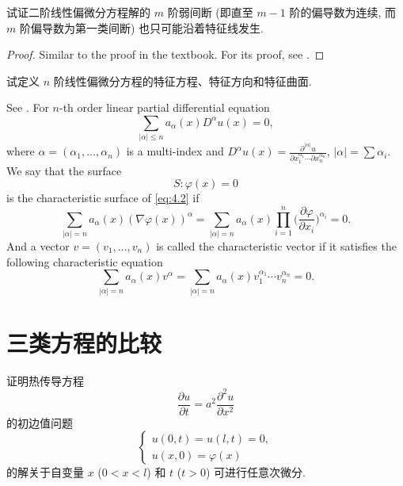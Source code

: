 \begin{exercise}
  试证二阶线性偏微分方程解的 $m$ 阶弱间断 (即直至 $m-1$ 阶的偏导数为连续, 而 $m$ 阶偏导数为第一类间断)
  也只可能沿着特征线发生.
\end{exercise}

\begin{proof}
  Similar to the proof in the textbook. For its proof,
  see \cite[\S2.1.2]{chen_2018}.
\end{proof}


\begin{exercise}
  试定义 $n$ 阶线性偏微分方程的特征方程、特征方向和特征曲面.
\end{exercise}

\begin{solution}
  See \cite[\S2.1.2]{chen_2018}.
  For $n$-th order linear partial differential equation
  \begin{equation}\label{eq:4.2}
    \sum_{|\alpha|\leq n} a_\alpha(x) D^\alpha u(x) = 0,
  \end{equation}
  where $\alpha=(\alpha_1,\ldots,\alpha_n)$ is a multi-index
  and $D^\alpha u(x) = \frac{\partial^{|\alpha|} u}{\partial x_1^{\alpha_1}\cdots\partial x_n^{\alpha_n}}$,
  $|\alpha| = \sum \alpha_i$. We say that the surface
  \begin{equation}\label{eq:4.3}
    S: \varphi(x) = 0
  \end{equation}
  is the characteristic surface of \eqref{eq:4.2} if
  \begin{equation}\label{eq:4.4}
    \sum_{|\alpha|=n} a_\alpha(x) (\nabla\varphi(x))^\alpha
      = \sum_{|\alpha|=n} a_\alpha(x) \prod_{i=1}^n
        \biggl(\frac{\partial\varphi}{\partial x_i}\biggr)^{\alpha_i} = 0.
  \end{equation}
  And a vector $v = (v_1,\ldots,v_n)$ is called the characteristic vector
  if it satisfies the following characteristic equation
  \begin{equation}\label{eq:4.5}
    \sum_{|\alpha|=n} a_\alpha(x) v^\alpha
      = \sum_{|\alpha|=n} a_\alpha(x) v_1^{\alpha_1} \cdots v_n^{\alpha_n} = 0.
  \end{equation}
\end{solution}


\section{三类方程的比较}


\begin{exercise}
  证明热传导方程
  \[\frac{\partial u}{\partial t} = a^2 \frac{\partial^2 u}{\partial x^2}\]
  的初边值问题
  \[\begin{cases}
    u(0, t) = u(l, t) = 0, \\
    u(x, 0) = \varphi(x)
  \end{cases}\]
  的解关于自变量 $x$ ($0<x<l$) 和 $t$ ($t>0$) 可进行任意次微分.
\end{exercise}


